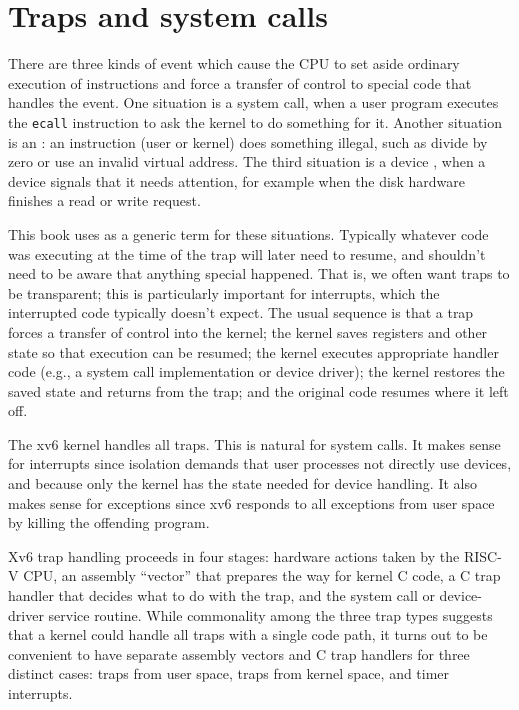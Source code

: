 \chapter{Traps and system calls}
\label{CH:TRAP}

There are three kinds of event which cause the CPU to set
aside ordinary execution of instructions and force a
transfer of control to special code that handles the event. One
situation is a system call, when a user program 
executes the {\tt ecall} instruction to ask the kernel to do 
something for it. Another situation is an :
an instruction (user or kernel) does something illegal, such as divide
by zero or use an invalid virtual address. The third situation is a
device , when a device signals that it needs
attention, for example when the disk hardware finishes a read or write
request.

This book uses  as a generic term for these
situations. Typically whatever code was executing at the time of the
trap will later need to resume, and shouldn't need to be aware that
anything special happened. That is, we often want traps to be
transparent; this is particularly important for interrupts, which the
interrupted code typically doesn't expect. The usual sequence is that
a trap forces a transfer of control into the kernel; the kernel saves
registers and other state so that execution can be resumed; the kernel
executes appropriate handler code (e.g., a system call implementation
or device driver); the kernel restores the saved state and returns
from the trap; and the original code resumes where it left off.

The xv6 kernel handles all traps. This is natural for system calls. It
makes sense for interrupts since isolation demands that user processes
not directly use devices, and because only the kernel has the state
needed for device handling. It also makes sense for exceptions since
xv6 responds to all exceptions from user space by killing the
offending program.

Xv6 trap handling proceeds in four stages: hardware actions taken by
the RISC-V CPU, an assembly ``vector'' that prepares the way for
kernel C code, a C trap handler that decides what to do with the trap,
and the system call or device-driver service routine. While
commonality among the three trap types suggests that a kernel could
handle all traps with a single code path, it turns out to be
convenient to have separate assembly vectors and C trap handlers for
three distinct cases: traps from user space, traps from kernel space,
and timer interrupts.

